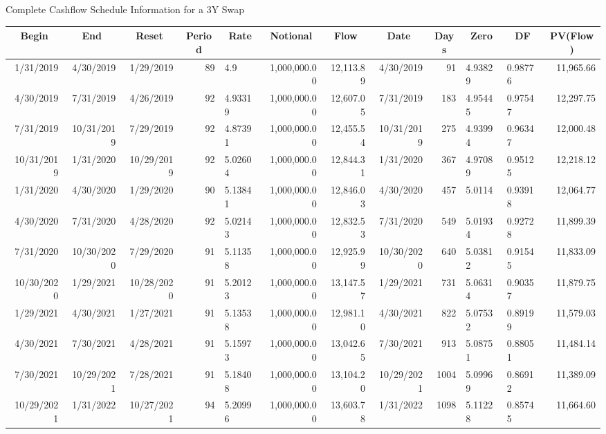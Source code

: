 \documentclass[handout, aspectratio=169]{beamer}
\begin{document}
\begin{frame}{Complete Cashflow Schedule Information for a 3Y Swap}
\begin{table}[t]
\begin{adjustbox}{max width=\textwidth, max height=\textheight}
\begin{tabular}{|r|r|r|r|l|r|r|r|r|l|l|r|}
				\hline
				\multicolumn{1}{|c|}{\textbf{Begin}} & \multicolumn{1}{c|}{\textbf{End}} & \multicolumn{1}{c|}{\textbf{Reset}} & 
				\multicolumn{1}{c|}{\textbf{Period}} & \multicolumn{1}{|c|}{\textbf{Rate}} & \multicolumn{1}{|c|}{\textbf{Notional}} &
				\multicolumn{1}{|c|}{\textbf{Flow}} &\multicolumn{1}{|c|}{\textbf{Date}} &\multicolumn{1}{|c|}{\textbf{Days}} &
				\multicolumn{1}{|c|}{\textbf{Zero}} &\multicolumn{1}{|c|}{\textbf{DF}} &\multicolumn{1}{|c|}{\textbf{PV(Flow)}} \\
				\hline
				1/31/2019 & 4/30/2019 & 1/29/2019 & 89 & 4.9 & 1,000,000.00 & 12,113.89 & 4/30/2019 & 91 & 4.93829 & 0.98776 & 11,965.66\\
				4/30/2019 & 7/31/2019 & 4/26/2019 & 92 & 4.93319 & 1,000,000.00 & 12,607.05 & 7/31/2019 & 183 & 4.95445 & 0.97547 & 12,297.75\\
				7/31/2019 & 10/31/2019 & 7/29/2019 & 92 & 4.87391 & 1,000,000.00 & 12,455.54 & 10/31/2019 & 275 & 4.93994 & 0.96347 & 12,000.48\\
				10/31/2019 & 1/31/2020 & 10/29/2019 & 92 & 5.02604 & 1,000,000.00 & 12,844.31 & 1/31/2020 & 367 & 4.97089 & 0.95125 & 12,218.12\\
				1/31/2020 & 4/30/2020 & 1/29/2020 & 90 & 5.13841 & 1,000,000.00 & 12,846.03 & 4/30/2020 & 457 & 5.0114 & 0.93918 & 12,064.77\\
				4/30/2020 & 7/31/2020 & 4/28/2020 & 92 & 5.02143 & 1,000,000.00 & 12,832.53 & 7/31/2020 & 549 & 5.01934 & 0.92728 & 11,899.39\\
				7/31/2020 & 10/30/2020 & 7/29/2020 & 91 & 5.11358 & 1,000,000.00 & 12,925.99 & 10/30/2020 & 640 & 5.03812 & 0.91545 & 11,833.09\\
				10/30/2020 & 1/29/2021 & 10/28/2020 & 91 & 5.20123 & 1,000,000.00 & 13,147.57 & 1/29/2021 & 731 & 5.06314 & 0.90357 & 11,879.75\\
				1/29/2021 & 4/30/2021 & 1/27/2021 & 91 & 5.13538 & 1,000,000.00 & 12,981.10 & 4/30/2021 & 822 & 5.07532 & 0.89199 & 11,579.03\\
				4/30/2021 & 7/30/2021 & 4/28/2021 & 91 & 5.15973 & 1,000,000.00 & 13,042.65 & 7/30/2021 & 913 & 5.08751 & 0.88051 & 11,484.14\\
				7/30/2021 & 10/29/2021 & 7/28/2021 & 91 & 5.18408 & 1,000,000.00 & 13,104.20 & 10/29/2021 & 1004 & 5.09969 & 0.86912 & 11,389.09\\
				10/29/2021 & 1/31/2022 & 10/27/2021 & 94 & 5.20996 & 1,000,000.00 & 13,603.78 & 1/31/2022 & 1098 & 5.11228 & 0.85745 & 11,664.60 \\
				\hline
			\end{tabular}
		\end{adjustbox}
	\end{table}
\end{frame}
\end{document}
